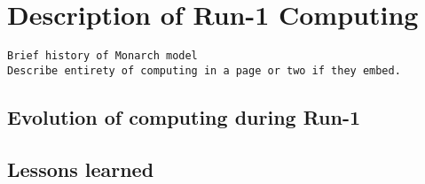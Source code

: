 \section{Description of Run-1 Computing}

\begin{verbatim}
Brief history of Monarch model
Describe entirety of computing in a page or two if they embed.
\end{verbatim}

\subsection{Evolution of computing during Run-1}

\subsection{Lessons learned}

